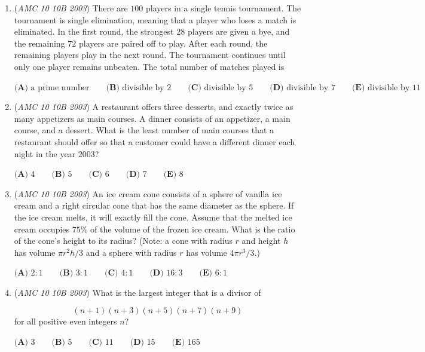 \begin{enumerate}
 $\textbf{(A) } 25 \qquad\textbf{(B) } 34 \qquad\textbf{(C) } 351 \qquad\textbf{(D) } 407 \qquad\textbf{(E) } 900$


	\item (\textit{AMC 10 10B 2003}) There are $100$ players in a single tennis tournament. The tournament is single elimination, meaning that a player who loses a match is eliminated. In the first round, the strongest $28$ players are given a bye, and the remaining $72$ players are paired off to play. After each round, the remaining players play in the next round. The tournament continues until only one player remains unbeaten. The total number of matches played is


 $\textbf{(A) } \text{a prime number} \qquad\textbf{(B) } \text{divisible by 2} \qquad\textbf{(C) } \text{divisible by 5} \qquad\textbf{(D) } \text{divisible by 7} \qquad\textbf{(E) } \text{divisible by 11}$


	\item (\textit{AMC 10 10B 2003}) A restaurant offers three desserts, and exactly twice as many appetizers as main courses. A dinner consists of an appetizer, a main course, and a dessert. What is the least number of main courses that a restaurant should offer so that a customer could have a different dinner each night in the year $2003$?


 $\textbf{(A) } 4 \qquad\textbf{(B) } 5 \qquad\textbf{(C) } 6 \qquad\textbf{(D) } 7 \qquad\textbf{(E) } 8$


	\item (\textit{AMC 10 10B 2003}) An ice cream cone consists of a sphere of vanilla ice cream and a right circular cone that has the same diameter as the sphere. If the ice cream melts, it will exactly fill the cone. Assume that the melted ice cream occupies $75\%$ of the volume of the frozen ice cream. What is the ratio of the cone's height to its radius? (Note: a cone with radius $r$ and height $h$ has volume $\pi r^2 h / 3$ and a sphere with radius $r$ has volume $4 \pi r^3 / 3$.)


 $\textbf{(A) } 2:1 \qquad\textbf{(B) } 3:1 \qquad\textbf{(C) } 4:1 \qquad\textbf{(D) } 16:3 \qquad\textbf{(E) } 6:1$


	\item (\textit{AMC 10 10B 2003}) What is the largest integer that is a divisor of

 \[(n+1)(n+3)(n+5)(n+7)(n+9)\]
for all positive even integers $n$?


 $\textbf{(A) } 3 \qquad\textbf{(B) } 5 \qquad\textbf{(C) } 11 \qquad\textbf{(D) } 15 \qquad\textbf{(E) } 165$



\end{enumerate}
